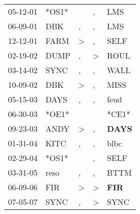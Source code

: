 \begin{supertabular}{p{0.07\textwidth}p{0.06\textwidth}p{0.02\textwidth}p{0.02\textwidth}p{0.06\textwidth}}
 05-12-01\textsuperscript{} &                   *OS1* &               &             , &            LMS\textsuperscript{} \\
 06-09-01\textsuperscript{} &   DBK\textsuperscript{} &             , &             , &            LMS\textsuperscript{} \\
 12-12-01\textsuperscript{} &  FARM\textsuperscript{} &  \textgreater &             , &           SELF\textsuperscript{} \\
 02-19-02\textsuperscript{} &  DUMP\textsuperscript{} &             , &  \textgreater &           ROUL\textsuperscript{} \\
 03-14-02\textsuperscript{} &  SYNC\textsuperscript{} &             , &             , &           WALL\textsuperscript{} \\
 10-09-02\textsuperscript{} &   DBK\textsuperscript{} &  \textgreater &             , &           MISS\textsuperscript{} \\
 05-15-03\textsuperscript{} &  DAYS\textsuperscript{} &             , &             , &           feud\textsuperscript{} \\
 06-30-03\textsuperscript{} &                   *OE1* &               &               &                            *CE1* \\
 09-23-03\textsuperscript{} &  ANDY\textsuperscript{} &  \textgreater &             , &  \textbf{DAYS\textsuperscript{}} \\
 01-31-04\textsuperscript{} &  KITC\textsuperscript{} &             , &             , &           blbc\textsuperscript{} \\
 02-29-04\textsuperscript{} &                   *OS1* &               &             , &           SELF\textsuperscript{} \\
 03-31-05\textsuperscript{} &  reso\textsuperscript{} &             , &             , &           BTTM\textsuperscript{} \\
 06-09-06\textsuperscript{} &   FIR\textsuperscript{} &  \textgreater &  \textgreater &   \textbf{FIR\textsuperscript{}} \\
 07-05-07\textsuperscript{} &  SYNC\textsuperscript{} &             , &  \textgreater &           SYNC\textsuperscript{} \\
\end{supertabular}

